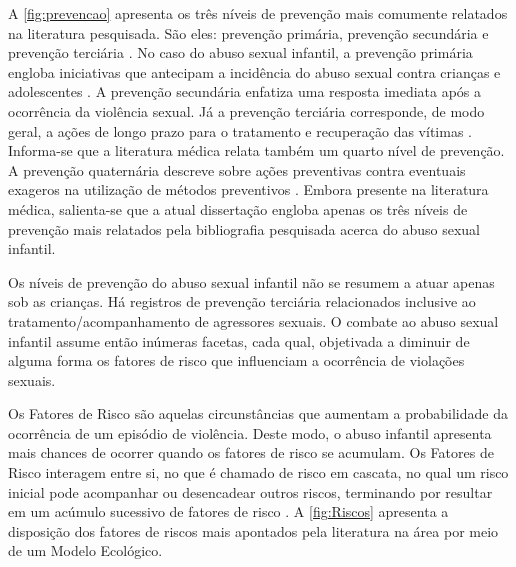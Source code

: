 A \autoref{fig:prevencao} apresenta os três níveis de prevenção mais comumente relatados na literatura pesquisada. São eles: prevenção primária, prevenção secundária e prevenção terciária \cite{dahlberg2006violencia, santos2011guia, maria2012abusos}. No caso do abuso sexual infantil, a prevenção primária engloba iniciativas que antecipam a incidência do abuso sexual contra crianças e adolescentes  \cite{marcelino2017vamos}. A prevenção secundária enfatiza uma resposta imediata após a ocorrência da violência sexual. Já a prevenção terciária corresponde, de modo geral, a ações de longo prazo para o tratamento e recuperação das vítimas \cite{people2020expert}. Informa-se que a literatura médica relata também um quarto nível de prevenção. A prevenção quaternária descreve sobre ações preventivas contra eventuais exageros na utilização de métodos preventivos \cite{tesser2017importante}. Embora presente na literatura médica, salienta-se que a atual dissertação engloba apenas os três níveis de prevenção mais relatados pela bibliografia pesquisada acerca do abuso sexual infantil.

Os níveis de prevenção do abuso sexual infantil não se resumem a atuar apenas sob as crianças. Há registros de prevenção terciária relacionados inclusive ao tratamento/acompanhamento de agressores sexuais. O combate ao abuso sexual infantil assume então inúmeras facetas, cada qual, objetivada a diminuir de alguma forma os fatores de risco que influenciam a ocorrência de violações sexuais.

Os Fatores de Risco são aquelas circunstâncias que aumentam a probabilidade da ocorrência de um episódio de violência. Deste modo, o abuso infantil apresenta mais chances de ocorrer quando os fatores de risco se acumulam. Os Fatores de Risco interagem entre si, no que é chamado de risco em cascata, no qual um risco inicial pode acompanhar ou desencadear outros riscos, terminando por resultar em um acúmulo sucessivo de fatores de risco \cite{Recommendations2019Taylor}. A \autoref{fig:Riscos} apresenta a disposição dos fatores de riscos mais apontados pela literatura na área por meio de um Modelo Ecológico. 



